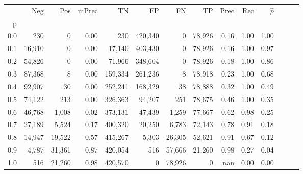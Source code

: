 \begin{tabular}{rrrrrrrrrrrrrr}
\toprule
{} &     Neg &     Pos & mPrec &       TN &       FP &      FN &      TP &  Prec &   Rec & $\hat{p}$ \\
p   &         &         &       &          &          &         &         &       &       &           \\
\midrule
0.0 &     230 &       0 &  0.00 &      230 &  420,340 &       0 &  78,926 &  0.16 &  1.00 &      1.00 \\
0.1 &  16,910 &       0 &  0.00 &   17,140 &  403,430 &       0 &  78,926 &  0.16 &  1.00 &      0.97 \\
0.2 &  54,826 &       0 &  0.00 &   71,966 &  348,604 &       0 &  78,926 &  0.18 &  1.00 &      0.86 \\
0.3 &  87,368 &       8 &  0.00 &  159,334 &  261,236 &       8 &  78,918 &  0.23 &  1.00 &      0.68 \\
0.4 &  92,907 &      30 &  0.00 &  252,241 &  168,329 &      38 &  78,888 &  0.32 &  1.00 &      0.49 \\
0.5 &  74,122 &     213 &  0.00 &  326,363 &   94,207 &     251 &  78,675 &  0.46 &  1.00 &      0.35 \\
0.6 &  46,768 &   1,008 &  0.02 &  373,131 &   47,439 &   1,259 &  77,667 &  0.62 &  0.98 &      0.25 \\
0.7 &  27,189 &   5,524 &  0.17 &  400,320 &   20,250 &   6,783 &  72,143 &  0.78 &  0.91 &      0.18 \\
0.8 &  14,947 &  19,522 &  0.57 &  415,267 &    5,303 &  26,305 &  52,621 &  0.91 &  0.67 &      0.12 \\
0.9 &   4,787 &  31,361 &  0.87 &  420,054 &      516 &  57,666 &  21,260 &  0.98 &  0.27 &      0.04 \\
1.0 &     516 &  21,260 &  0.98 &  420,570 &        0 &  78,926 &       0 &   nan &  0.00 &      0.00 \\
\bottomrule
\end{tabular}
